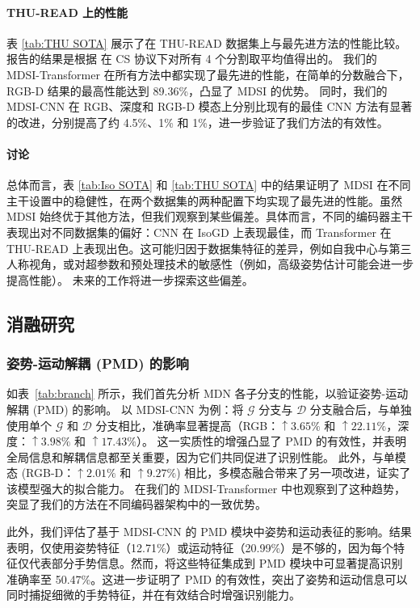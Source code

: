 \paragraph{THU-READ 上的性能}
表 \ref{tab:THU SOTA} 展示了在 THU-READ 数据集上与最先进方法的性能比较。报告的结果是根据 \cite{tang2018multi} 在 CS 协议下对所有 4 个分割取平均值得出的。
我们的 MDSI-Transformer 在所有方法中都实现了最先进的性能，在简单的分数融合下，RGB-D 结果的最高性能达到 89.36\%，凸显了 MDSI 的优势。
同时，我们的 MDSI-CNN 在 RGB、深度和 RGB-D 模态上分别比现有的最佳 CNN 方法有显著的改进，分别提高了约 4.5\%、1\% 和 1\%，进一步验证了我们方法的有效性。

\paragraph{讨论}
总体而言，表 \ref{tab:Iso SOTA} 和 \ref{tab:THU SOTA} 中的结果证明了 MDSI 在不同主干设置中的稳健性，在两个数据集的两种配置下均实现了最先进的性能。虽然 MDSI 始终优于其他方法，但我们观察到某些偏差。具体而言，不同的编码器主干表现出对不同数据集的偏好：CNN 在 IsoGD 上表现最佳，而 Transformer 在 THU-READ 上表现出色。这可能归因于数据集特征的差异，例如自我中心与第三人称视角，或对超参数和预处理技术的敏感性（例如，高级姿势估计可能会进一步提高性能）。
未来的工作将进一步探索这些偏差。

\subsection{消融研究}
\subsubsection{姿势-运动解耦 (PMD) 的影响}
如表~\ref{tab:branch} 所示，我们首先分析 MDN 各子分支的性能，以验证姿势-运动解耦 (PMD) 的影响。
以 MDSI-CNN 为例：将 $\mathcal{G}$ 分支与 $\mathcal{D}$ 分支融合后，与单独使用单个 $\mathcal{G}$ 和 $\mathcal{D}$ 分支相比，准确率显著提高（RGB：$\uparrow3.65\%$ 和 $\uparrow22.11\%$，深度：$\uparrow3.98\%$ 和 $\uparrow17.43\%$）。
这一实质性的增强凸显了 PMD 的有效性，并表明全局信息和解耦信息都至关重要，因为它们共同促进了识别性能。
此外，与单模态 (RGB-D：$\uparrow2.01\%$ 和 $\uparrow9.27\%$) 相比，多模态融合带来了另一项改进，证实了该模型强大的拟合能力。
在我们的 MDSI-Transformer 中也观察到了这种趋势，突显了我们的方法在不同编码器架构中的一致优势。

此外，我们评估了基于 MDSI-CNN 的 PMD 模块中姿势和运动表征的影响。结果表明，仅使用姿势特征（12.71\%）或运动特征（20.99\%）是不够的，因为每个特征仅代表部分手势信息。然而，将这些特征集成到 PMD 模块中可显著提高识别准确率至 50.47\%。这进一步证明了 PMD 的有效性，突出了姿势和运动信息可以同时捕捉细微的手势特征，并在有效结合时增强识别能力。

